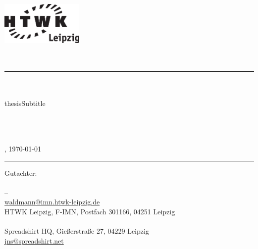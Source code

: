 
\begin{center}
    \includegraphics[width=4cm]{frontpage/HTWK_Logo_schwarz}\\
    \vspace{12pt}
    \large
        \textbf{\thesisUniversity}\\
    \vspace{6pt}
    \normalsize
        \thesisUniversityDepartment\\

    \vspace{24pt}
    \rule{\textwidth}{0.5pt}
    \vspace{12pt}

    \Huge
        \thesisDesignator{}\\
    \vspace{12pt}
    \Large
        \textbf{\thesisTitle}\\
        \ifcsname thesisSubtitle \endcsname
            \large
            \thesisSubtitle
        \else
        \fi
    \vspace{24pt}

    \vspace{6pt}
    \large
        \textbf{\thesisAuthor}\\
        \vspace{3pt}
        \normalsize
        \thesisAuthorClass\\
        \href{mailto:\thesisAuthorEmail}{\thesisAuthorEmail}\\
        \thesisAuthorCity, \today\\        

    \vspace{24pt}
    \rule{\textwidth}{0.5pt}
    \vspace{12pt}

    \vfill
    \small
        Gutachter:\\
    \vspace{6pt}
    \large
        \thesisAdvisor\\
    \small
        \thesisUniversity{} -- \thesisUniversityDepartment\\
        \href{mailto:waldmann@imn.htwk-leipzig.de}{waldmann@imn.htwk-leipzig.de}\\
        HTWK Leipzig, F-IMN, Postfach 301166, 04251 Leipzig\\

    \vspace{6pt}
    \large
        \thesisAdvisorSprd\\
    \small
        Spreadshirt HQ, Gießerstraße 27, 04229 Leipzig\\
        \href{mailto:jns@spreadshirt.net}{jns@spreadshirt.net}\\
\end{center}
